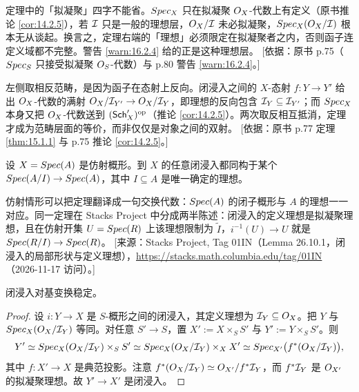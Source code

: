 \begin{yizhu}
定理中的「拟凝聚」四字不能省。$Spec_X$ 只在拟凝聚 $O_X$-代数上有定义（原书推论 \ref{cor:14.2.5}），若 $\mathcal{I}$ 只是一般的理想层，$O_X/\mathcal{I}$ 未必拟凝聚，$Spec_X(O_X/\mathcal{I})$ 根本无从谈起。换言之，定理右端的「理想」必须限定在拟凝聚者之内，否则函子连定义域都不完整。警告 \ref{warn:16.2.4} 给的正是这种理想层。
[依据：原书 p.75（$Spec_S$ 只接受拟凝聚 $O_S$-代数）与 p.80 警告 \ref{warn:16.2.4}。]
\end{yizhu}

\begin{yizhu}
左侧取相反范畴，是因为函子在态射上反向。闭浸入之间的 $X$-态射 $f \colon Y \to Y'$ 给出 $O_X$-代数的满射 $O_X/\mathcal{I}_{Y'} \to O_X/\mathcal{I}_Y$，即理想的反向包含 $\mathcal{I}_Y \subseteq \mathcal{I}_{Y'}$；而 $Spec_X$ 本身又把 $O_X$-代数送到 $(\mathsf{Sch}'_X)^{\mathrm{op}}$（推论 \ref{cor:14.2.5}）。两次取反相互抵消，定理才成为范畴层面的等价，而非仅仅是对象之间的双射。
[依据：原书 p.77 定理 \ref{thm:15.1.1} 与 p.75 推论 \ref{cor:14.2.5}。]
\end{yizhu}

\begin{corollary}\label{cor:15.1.2}
设 $X = Spec(A)$ 是仿射概形。到 $X$ 的任意闭浸入都同构于某个 $Spec(A/I) \to Spec(A)$，其中 $I \subseteq A$ 是唯一确定的理想。
\end{corollary}

\begin{yizhu}
仿射情形可以把定理翻译成一句交换代数：$Spec(A)$ 的闭子概形与 $A$ 的理想一一对应。同一定理在 Stacks Project 中分成两半陈述：闭浸入的定义理想是拟凝聚理想，且在仿射开集 $U = Spec(R)$ 上该理想限制为 $\widetilde{I}$，$i^{-1}(U) \to U$ 就是 $Spec(R/I) \to Spec(R)$。
[来源：Stacks Project, Tag 01IN（Lemma 26.10.1，闭浸入的局部形状与定义理想），\url{https://stacks.math.columbia.edu/tag/01IN}（2026-11-17 访问）。]
\end{yizhu}

\begin{corollary}\label{cor:15.1.3}
闭浸入对基变换稳定。
\end{corollary}

\begin{proof}
设 $i \colon Y \to X$ 是 $S$-概形之间的闭浸入，其定义理想为 $\mathcal{I}_Y \subseteq O_X$。把 $Y$ 与 $Spec_X(O_X/\mathcal{I}_Y)$ 等同。对任意 $S' \to S$，置 $X' := X \times_S S'$ 与 $Y' := Y \times_S S'$。则
\[
Y' \simeq Spec_X(O_X/\mathcal{I}_Y) \times_S S' \simeq Spec_X(O_X/\mathcal{I}_Y) \times_X X' \simeq Spec_{X'}\bigl(f^*(O_X/\mathcal{I}_Y)\bigr),
\]
其中 $f \colon X' \to X$ 是典范投影。注意 $f^*(O_X/\mathcal{I}_Y) \simeq O_{X'}/f^*\mathcal{I}_Y$，而 $f^*\mathcal{I}_Y$ 是 $O_{X'}$ 的拟凝聚理想。故 $Y' \to X'$ 是闭浸入。
\end{proof}

